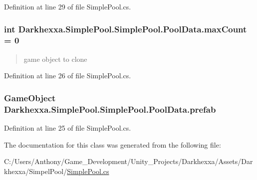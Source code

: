Definition at line 29 of file Simple\-Pool.\-cs.

\hypertarget{class_darkhexxa_1_1_simple_pool_1_1_simple_pool_1_1_pool_data_ae2d66b8c6f3d77721c5ca3474cac1311}{
\subsubsection[{max\-Count}]{\setlength{\rightskip}{0pt plus 5cm}int Darkhexxa.\-Simple\-Pool.\-Simple\-Pool.\-Pool\-Data.\-max\-Count = 0}}\label{class_darkhexxa_1_1_simple_pool_1_1_simple_pool_1_1_pool_data_ae2d66b8c6f3d77721c5ca3474cac1311}


\begin{quotation}
game object to clone \end{quotation}




Definition at line 26 of file Simple\-Pool.\-cs.

\hypertarget{class_darkhexxa_1_1_simple_pool_1_1_simple_pool_1_1_pool_data_afeeca245f87b8bef8c5a954c7b78011c}{
\subsubsection[{prefab}]{\setlength{\rightskip}{0pt plus 5cm}Game\-Object Darkhexxa.\-Simple\-Pool.\-Simple\-Pool.\-Pool\-Data.\-prefab}}\label{class_darkhexxa_1_1_simple_pool_1_1_simple_pool_1_1_pool_data_afeeca245f87b8bef8c5a954c7b78011c}


Definition at line 25 of file Simple\-Pool.\-cs.



The documentation for this class was generated from the following file\-:\begin{DoxyCompactItemize}
\item 
C\-:/\-Users/\-Anthony/\-Game\-\_\-\-Development/\-Unity\-\_\-\-Projects/\-Darkhexxa/\-Assets/\-Darkhexxa/\-Simpel\-Pool/\hyperlink{_simple_pool_8cs}{Simple\-Pool.\-cs}\end{DoxyCompactItemize}
